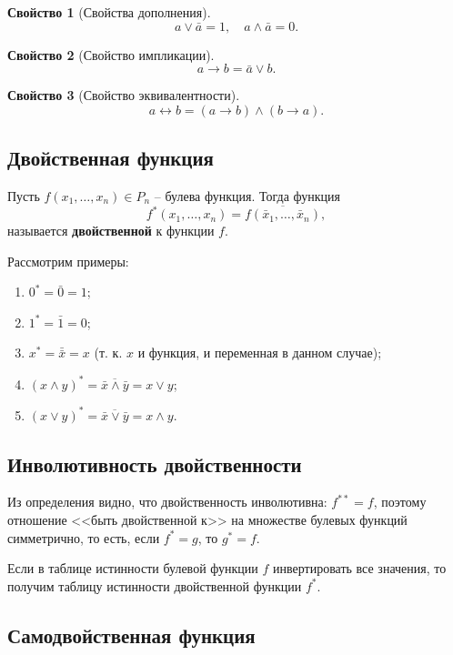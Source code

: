 \documentclass[a5paper, 11pt]{extarticle}
\theoremstyle{definition}
\newtheorem{property}{Свойство}[subsection]
\theoremstyle{definition}
\theoremstyle{definition}
\numberwithin{figure}{section}
\numberwithin{table}{section}
\begin{document}
\begin{property}[Свойства дополнения]
    \[
        a \lor \bar{a} = 1,
        \quad
        a \land \bar{a} = 0.
    \]
\end{property}

\begin{property}[Свойство импликации]
    \[
        a \to b = \bar{a} \lor b.
    \]
\end{property}

\begin{property}[Свойство эквивалентности]
    \[
        a \leftrightarrow b = (a \to b) \land (b \to a).
    \]
\end{property}

\subsection{Двойственная функция}

Пусть \(f(x_1, \ldots, x_n) \in P_n\) -- булева функция. Тогда функция
\[
    f^*(x_1, \ldots, x_n) = \overline{f(\bar{x}_1, \ldots, \bar{x}_n)},
\]
называется \textbf{двойственной} к функции \(f\).

Рассмотрим примеры:
\begin{enumerate}
    \item \(0^* = \bar{0} = 1\);
    \item \(1^* = \bar{1} = 0\);
    \item \(x^* = \bar{\bar{x}} = x\) (т. к. \(x\) и функция, и переменная в данном случае);
    \item \((x \land y)^* = \overline{\bar{x} \land \bar{y}} = x \lor y\);
    \item \((x \lor y)^* = \overline{\bar{x} \lor \bar{y}} = x \land y\).
\end{enumerate}

\subsection{Инволютивность двойственности}

Из определения видно, что двойственность инволютивна: \(f^{**} = f\), поэтому отношение <<быть двойственной к>> на множестве булевых функций симметрично, то есть, если \(f^* = g\), то \(g^* = f\).

Если в таблице истинности булевой функции \(f\) инвертировать все значения, то получим таблицу истинности двойственной функции \(f^*\).

\subsection{Самодвойственная функция}
\end{document}
